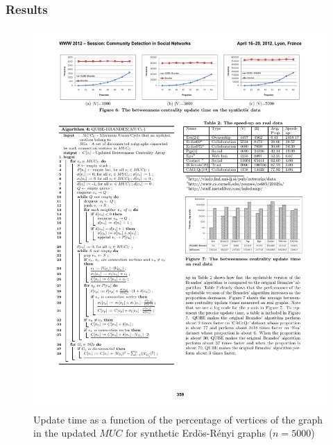 \begin{frame}
  \frametitle{Results}

  \begin{figure}[t]
    \centering
    \includegraphics[width=\textwidth, height=0.7\textheight, keepaspectratio]{imgs/qube-results1}
    \caption{Update time as a function of the percentage of vertices of the graph in the updated $MUC$ for synthetic Erd\"{o}s-R\'{e}nyi graphs ($n = 5000$)}
  \end{figure}

\end{frame}


